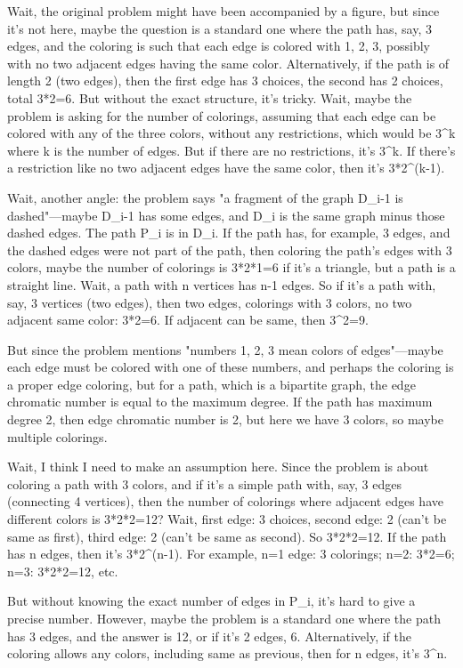 Wait, the original problem might have been accompanied by a figure, but since it's not here, maybe the question is a standard one where the path has, say, 3 edges, and the coloring is such that each edge is colored with 1, 2, 3, possibly with no two adjacent edges having the same color. Alternatively, if the path is of length 2 (two edges), then the first edge has 3 choices, the second has 2 choices, total 3*2=6. But without the exact structure, it's tricky. Wait, maybe the problem is asking for the number of colorings, assuming that each edge can be colored with any of the three colors, without any restrictions, which would be 3^k where k is the number of edges. But if there are no restrictions, it's 3^k. If there's a restriction like no two adjacent edges have the same color, then it's 3*2^(k-1). 

Wait, another angle: the problem says "a fragment of the graph D_i-1 is dashed"—maybe D_i-1 has some edges, and D_i is the same graph minus those dashed edges. The path P_i is in D_i. If the path has, for example, 3 edges, and the dashed edges were not part of the path, then coloring the path's edges with 3 colors, maybe the number of colorings is 3*2*1=6 if it's a triangle, but a path is a straight line. Wait, a path with n vertices has n-1 edges. So if it's a path with, say, 3 vertices (two edges), then two edges, colorings with 3 colors, no two adjacent same color: 3*2=6. If adjacent can be same, then 3^2=9. 

But since the problem mentions "numbers 1, 2, 3 mean colors of edges"—maybe each edge must be colored with one of these numbers, and perhaps the coloring is a proper edge coloring, but for a path, which is a bipartite graph, the edge chromatic number is equal to the maximum degree. If the path has maximum degree 2, then edge chromatic number is 2, but here we have 3 colors, so maybe multiple colorings. 

Wait, I think I need to make an assumption here. Since the problem is about coloring a path with 3 colors, and if it's a simple path with, say, 3 edges (connecting 4 vertices), then the number of colorings where adjacent edges have different colors is 3*2*2=12? Wait, first edge: 3 choices, second edge: 2 (can't be same as first), third edge: 2 (can't be same as second). So 3*2*2=12. If the path has n edges, then it's 3*2^(n-1). For example, n=1 edge: 3 colorings; n=2: 3*2=6; n=3: 3*2*2=12, etc. 

But without knowing the exact number of edges in P_i, it's hard to give a precise number. However, maybe the problem is a standard one where the path has 3 edges, and the answer is 12, or if it's 2 edges, 6. Alternatively, if the coloring allows any colors, including same as previous, then for n edges, it's 3^n. 

